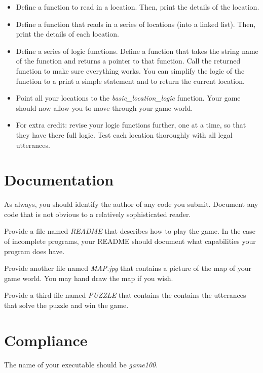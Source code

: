 \documentclass[12pt]{article}
\begin{document}
\begin{itemize}
\item
Define a function to read in a location. Then, print the details
of the location.

\item
Define a function that reads in a series of locations (into a linked list).
Then, print the details of each location.

\item
Define a series of logic functions. Define a function that takes the
string name of the function and returns a pointer to that function.
Call the returned function to make sure everything works. You can
simplify the logic of the function to a print a simple statement
and to return the current location.

\item
Point all your locations to the {\it basic\_location\_logic} function.
Your game should now allow you to move through your game world.

\item
For extra credit:
revise your logic functions further, one at a time, so that they
have there full logic. Test each location thoroughly with all
legal utterances.
\end{itemize}

\section*{Documentation}

As always,
you should identify the author of any code you submit.  Document any
code that is not obvious to a relatively sophisticated reader.

Provide a file named {\it README} that describes how to play the game.
In the case of incomplete programs, your README should document what
capabilities your program does have.

Provide another file named {\it MAP.jpg} that contains a picture
of the map of your game world. You may hand draw the map if you wish.

Provide a third file named {\it PUZZLE} that contains the contains
the utterances that solve the puzzle and win the game.

\section*{Compliance}

The name of your executable should be {\it game100}.
\end{document}
